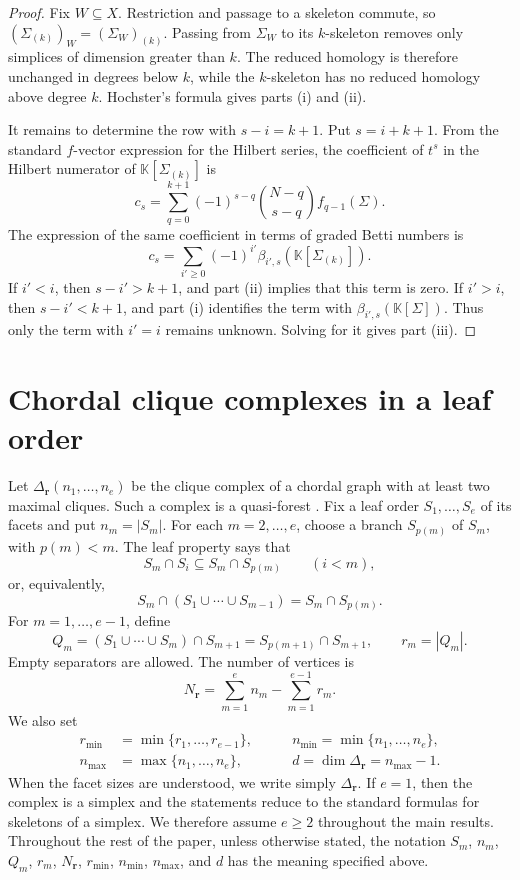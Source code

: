 \documentclass[11pt]{amsart}
\theoremstyle{definition}
\theoremstyle{remark}
\newcommand{\K}{\mathbb K}
\newcommand{\SR}[1]{\K[#1]}
\begin{document}
	\begin{proof}
		Fix $W\subseteq X$. Restriction and passage to a skeleton commute, so $(\Sigma_{(k)})_W=(\Sigma_W)_{(k)}$. Passing from $\Sigma_W$ to its $k$-skeleton removes only simplices of dimension greater than $k$. The reduced homology is therefore unchanged in degrees below $k$, while the $k$-skeleton has no reduced homology above degree $k$. Hochster's formula gives parts (i) and (ii).
		
		It remains to determine the row with $s-i=k+1$. Put $s=i+k+1$. From the standard $f$-vector expression for the Hilbert series, the coefficient of $t^s$ in the Hilbert numerator of $\SR{\Sigma_{(k)}}$ is
		\[
		c_s=\sum_{q=0}^{k+1}(-1)^{s-q}\binom{N-q}{s-q}f_{q-1}(\Sigma).
		\]
		The expression of the same coefficient in terms of graded Betti numbers is
		\[
		c_s=\sum_{i'\ge0}(-1)^{i'}\beta_{i',s}(\SR{\Sigma_{(k)}}).
		\]
		If $i'<i$, then $s-i'>k+1$, and part (ii) implies that this term is zero. If $i'>i$, then $s-i'<k+1$, and part (i) identifies the term with $\beta_{i',s}(\SR{\Sigma})$. Thus only the term with $i'=i$ remains unknown. Solving for it gives part (iii).
	\end{proof}
	
	\section{Chordal clique complexes in a leaf order}\label{sec:3}
	
	Let $\Delta_{\mathbf r}(n_1,\ldots,n_e)$ be the clique complex of a chordal graph with at least two maximal cliques. Such a complex is a quasi-forest \cite{HHZ04,HHMTZ08}. Fix a leaf order $S_1,\ldots,S_e$ of its facets and put $n_m=|S_m|$. For each $m=2,\ldots,e$, choose a branch $S_{p(m)}$ of $S_m$, with $p(m)<m$. The leaf property says that
	\[
	S_m\cap S_i\subseteq S_m\cap S_{p(m)}\qquad(i<m),
	\]
	or, equivalently,
	\[
	S_m\cap(S_1\cup\cdots\cup S_{m-1})=S_m\cap S_{p(m)}.
	\]
	For $m=1,\ldots,e-1$, define
	\[
	Q_m=(S_1\cup\cdots\cup S_m)\cap S_{m+1}
	=S_{p(m+1)}\cap S_{m+1},
	\qquad r_m=|Q_m|.
	\]
	Empty separators are allowed. The number of vertices is
	\[
	N_{\mathbf r}=\sum_{m=1}^e n_m-\sum_{m=1}^{e-1}r_m.
	\]
	We also set
	\[
	\begin{aligned}
		r_{\min}&=\min\{r_1,\ldots,r_{e-1}\},
		&\qquad n_{\min}=\min\{n_1,\ldots,n_e\},\\
		n_{\max}&=\max\{n_1,\ldots,n_e\},
		&\qquad d=\dim\Delta_{\mathbf r}=n_{\max}-1.
	\end{aligned}
	\]
	When the facet sizes are understood, we write simply $\Delta_{\mathbf r}$. If $e=1$, then the complex is a simplex and the statements reduce to the standard formulas for skeletons of a simplex. We therefore assume $e\ge2$ throughout the main results.
	Throughout the rest of the paper, unless otherwise stated, the notation $S_m$, $n_m$, $Q_m$, $r_m$, $N_{\mathbf r}$, $r_{\min}$, $n_{\min}$, $n_{\max}$, and $d$ has the meaning specified above.
	
\end{document}
